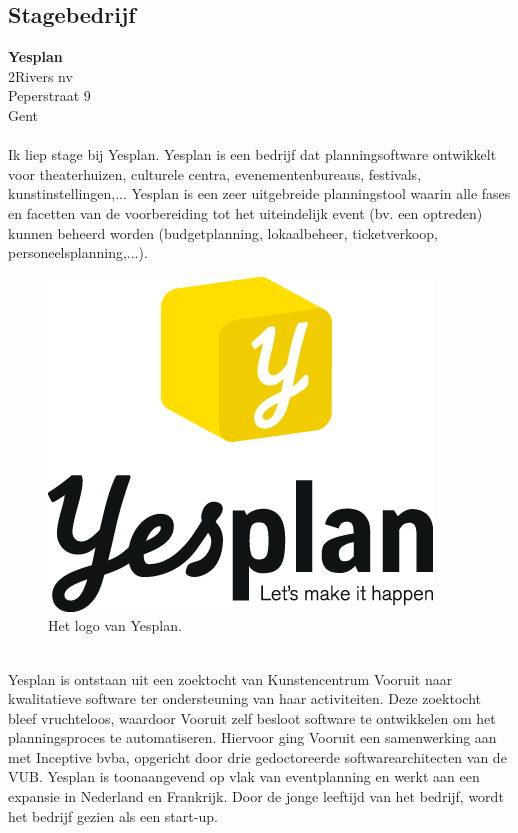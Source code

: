 \documentclass[a4paper,11pt]{article}
\theoremstyle{definition}
\begin{document}
\subsection{Stagebedrijf}

\textbf{Yesplan}\\
\noindent 2Rivers nv\\
\noindent 	Peperstraat 9\\
 Gent\\

\\ \noindent Ik liep stage bij Yesplan. Yesplan is een bedrijf dat planningsoftware
ontwikkelt voor theaterhuizen, culturele centra, evenementenbureaus, festivals, kunstinstellingen,... Yesplan is een zeer uitgebreide 
planningstool waarin alle fases en facetten van de voorbereiding tot het uiteindelijk event (bv. een optreden) kunnen beheerd worden 
(budgetplanning, lokaalbeheer, ticketverkoop, personeelsplanning,...).\begin{figure}[h!]
  \centering
  \includegraphics[scale=0.3]{logoyes.png}\caption{Het logo van Yesplan.}\label{3}
\end{figure}
\\

\noindent Yesplan is
ontstaan uit een zoektocht van Kunstencentrum Vooruit naar kwalitatieve software ter ondersteuning
van haar activiteiten. Deze zoektocht bleef vruchteloos, waardoor Vooruit zelf besloot software te ontwikkelen
om het planningsproces te automatiseren. Hiervoor ging Vooruit een samenwerking aan 
met Inceptive bvba, opgericht door drie gedoctoreerde softwarearchitecten van de VUB. Yesplan is
toonaangevend op vlak van eventplanning en werkt aan een expansie in Nederland en Frankrijk. Door de jonge leeftijd
van het bedrijf, wordt het bedrijf gezien als een start-up. \\
\end{document}
